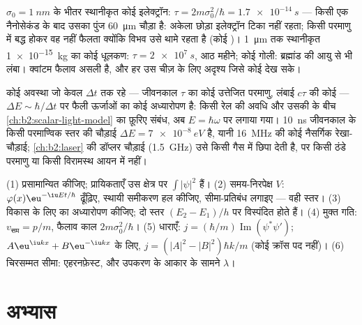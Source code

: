 \begin{example}[फैलता कौन है]\label{ex:b2:schrodinger-wave-functions:spreading}
$\sigma_0 = \qty{1}{nm}$ के भीतर स्थानीकृत कोई इलेक्ट्रॉन: $\tau = 2m\sigma_0^2/\hbar
= \qty{1.7e-14}{s}$ --- किसी एक नैनोसेकंड के बाद उसका पुंज \qty{60}{\micro m}
चौड़ा है: अकेला छोड़ा इलेक्ट्रॉन टिका नहीं रहता; किसी परमाणु में बद्ध होकर वह
नहीं फैलता क्योंकि विभव उसे थामे रहता है (कोई )।
\qty{1}{\micro m} तक स्थानीकृत \qty{1e-15}{kg} का कोई धूलकण: $\tau =
\qty{2e7}{s}$, आठ महीने; कोई गोली: ब्रह्मांड की आयु से भी लंबा।
क्वांटम फैलाव असली है, और हर उस चीज़ के लिए अदृश्य जिसे कोई देख सके।
\end{example}

\begin{remark}[ऊर्जा और समय]\label{rem:b2:schrodinger-wave-functions:energytime}
कोई अवस्था जो केवल $\Delta t$ तक रहे --- जीवनकाल $\tau$ का कोई उत्तेजित परमाणु,
लंबाई $c\tau$ की कोई  --- $\Delta E \sim \hbar/\Delta t$ पर फैली
ऊर्जाओं का कोई अध्यारोपण है: किसी रेल की अवधि और उसकी
 के बीच \cref{ch:b2:scalar-light-model} का फ़ूरिए संबंध,
अब $E = \hbar\omega$ पर लगाया गया। \qty{10}{ns} जीवनकाल के किसी परमाण्विक स्तर की
चौड़ाई $\Delta E = \qty{7e-8}{eV}$ है, यानी \qty{16}{MHz} की कोई नैसर्गिक
रेखा-चौड़ाई; \cref{ch:b2:laser} की डॉप्लर चौड़ाई
(\qty{1.5}{GHz}) उसे किसी गैस में छिपा देती है, पर किसी ठंडे परमाणु या किसी विरामस्थ
आयन में नहीं।
\end{remark}

\begin{method}[तरंग फलनों के साथ काम]\label{meth:b2:schrodinger-wave-functions:method}
(1) प्रसामान्यित कीजिए; प्रायिकताएँ उस क्षेत्र पर $\int|\psi|^2$ हैं। (2)
समय-निरपेक्ष $V$: $\varphi(x)\eu^{-\iu Et/\hbar}$ ढूँढ़िए,
स्थायी समीकरण हल कीजिए, सीमा-प्रतिबंध लगाइए --- वही स्तर।
(3) विकास के लिए  का अध्यारोपण कीजिए; दो स्तर
$(E_2 - E_1)/h$ पर विस्पंदित होते हैं। (4) मुक्त गति: $v_{\text{सम}} = p/m$, फैलाव काल
$2m\sigma_0^2/\hbar$। (5) धाराएँ: $j = (\hbar/m)\operatorname{Im}(\psi^*\psi')$;
$A\eu^{\iu kx} + B\eu^{-\iu kx}$ के लिए, $j = (|A|^2 - |B|^2)\hbar k/m$ (कोई क्रॉस पद नहीं)।
(6) चिरसम्मत सीमा: एहरनफ़ेस्ट, और उपकरण के आकार के सामने
$\lambda$।
\end{method}

\section{अभ्यास}

